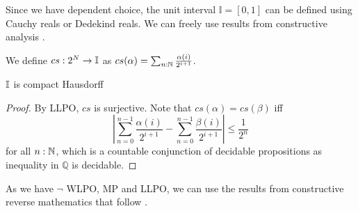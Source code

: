 Since we have dependent choice, the unit interval $\mathbb I = [0,1]$ can be defined using 
Cauchy reals or Dedekind reals. 
We can freely use results from constructive analysis \cite{Bishop}. 
\begin{definition}
  We define $cs:2^N \to \mathbb{I}$ as 
  $cs(\alpha) = \sum_{n:\mathbb{N}} \frac{\alpha(i)}{2^{i+1}}$. 
\end{definition}

\begin{theorem}
  $\mathbb{I}$ is compact Hausdorff
\end{theorem}
\begin{proof}
  By LLPO, $cs$ is surjective.   
  Note that $cs(\alpha) = cs(\beta)$ iff 
  $$|\sum_{n=0}^{n-1} \frac{\alpha(i)}{2^{i+1}}-
  \sum_{n=0}^{n-1} \frac{\beta(i)}{2^{i+1}}|\leq \frac{1}{2^n}$$
  for all $n:\mathbb{N}$, which is a countable conjunction of decidable propositions as 
  inequality in $\mathbb Q$ is decidable. 
\end{proof}

As we have $\neg$ WLPO, MP and LLPO, we can use the results from 
constructive reverse mathematics that follow \cite{ReverseMathsBishop, HannesDiener}. 
